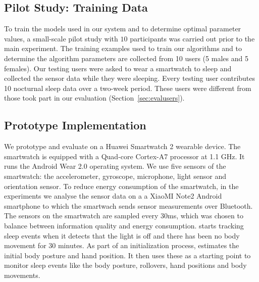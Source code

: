 \subsection{Pilot Study: Training Data\label{sec:trainingdata}}
To train the models used in our system and to determine optimal parameter values, a small-scale pilot study with $10$ participants was carried out prior to the main experiment.  The training examples used to train our algorithms and to determine the algorithm parameters are collected from 10 users
	(5 males and 5 females). Our testing users were asked to wear a smartwatch to sleep and collected the sensor data
	while they were sleeping. Every testing user contributes 10 nocturnal sleep data over a two-week period. These users were 
	different from those took part in our evaluation (Section~\ref{sec:evalusers}).



\subsection{Prototype Implementation \label{sec:implementation}}
We prototype and evaluate \systemname on a Huawei Smartwatch 2 wearable device. The smartwatch is equipped with a Quad-core Cortex-A7
processor at 1.1 GHz.  It runs the Android Wear 2.0 operating system. We use five sensors of the smartwatch: the accelerometer, gyroscope,
microphone, light sensor and orientation sensor. To reduce energy consumption of the smartwatch, in the experiments we analyse the sensor data on a a XiaoMI Note2 Android smartphone to which the smartwach sends sensor measurements over Bluetooth. The sensors on the smartwatch are sampled every $30$ms, which was chosen to balance between information quality and energy consumption. \systemname starts tracking sleep events when it detects that the light is off and there has been no body movement for 30 minutes. As part of an initialization process, \systemname estimates the initial body posture and hand position. It then uses these as a starting point to monitor sleep events like the body posture, rollovers, hand positions and body movements.
